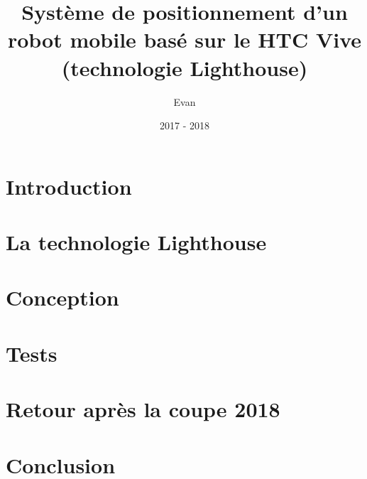 \documentclass[10pt,a4paper,french]{report}
\title{Système de positionnement d'un robot mobile basé sur le HTC Vive (technologie Lighthouse)}
\author{Evan \bsc{Roué}}
\date{2017 - 2018}
\begin{document}
\maketitle



\tableofcontents

\thispagestyle{empty}
\setcounter{page}{0}

\chapter{Introduction}


\chapter{La technologie Lighthouse}


\chapter{Conception}


\chapter{Tests}


\chapter{Retour après la coupe 2018}


\chapter{Conclusion}

\end{document}
